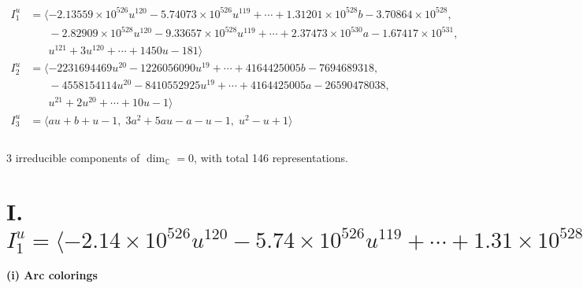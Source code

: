 \documentclass[1p]{elsarticle_modified}
\theoremstyle{definition}
\begin{document}
\begin{align*}
I^u_{1}&=\langle 
-2.13559\times10^{526} u^{120}-5.74073\times10^{526} u^{119}+\cdots+1.31201\times10^{528} b-3.70864\times10^{528},\\
\phantom{I^u_{1}}&\phantom{= \langle  }-2.82909\times10^{528} u^{120}-9.33657\times10^{528} u^{119}+\cdots+2.37473\times10^{530} a-1.67417\times10^{531},\\
\phantom{I^u_{1}}&\phantom{= \langle  }u^{121}+3 u^{120}+\cdots+1450 u-181\rangle \\
I^u_{2}&=\langle 
-2231694469 u^{20}-1226056090 u^{19}+\cdots+4164425005 b-7694689318,\\
\phantom{I^u_{2}}&\phantom{= \langle  }-4558154114 u^{20}-8410552925 u^{19}+\cdots+4164425005 a-26590478038,\\
\phantom{I^u_{2}}&\phantom{= \langle  }u^{21}+2 u^{20}+\cdots+10 u-1\rangle \\
I^u_{3}&=\langle 
a u+b+u-1,\;3 a^2+5 a u- a- u-1,\;u^2- u+1\rangle \\
\\
\end{align*}
\raggedright * 3 irreducible components of $\dim_{\mathbb{C}}=0$, with total 146 representations.\\
\newpage
\renewcommand{\arraystretch}{1}
\centering \section*{I. $I^u_{1}= \langle -2.14\times10^{526} u^{120}-5.74\times10^{526} u^{119}+\cdots+1.31\times10^{528} b-3.71\times10^{528},\;-2.83\times10^{528} u^{120}-9.34\times10^{528} u^{119}+\cdots+2.37\times10^{530} a-1.67\times10^{531},\;u^{121}+3 u^{120}+\cdots+1450 u-181 \rangle$}
\flushleft \textbf{(i) Arc colorings}\\
\end{document}
